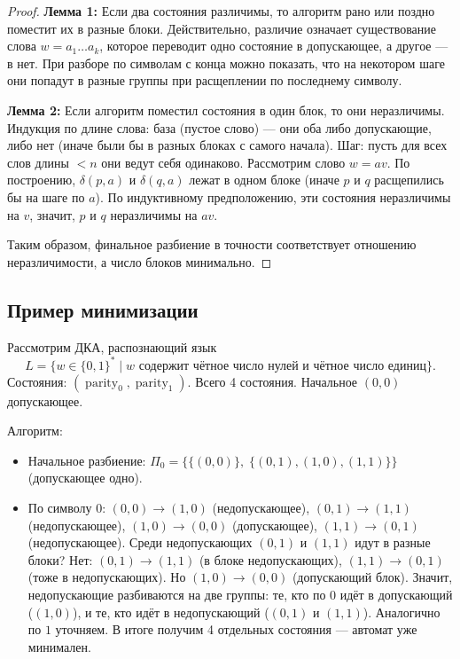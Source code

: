 \documentclass[12pt,a4paper]{article}
\theoremstyle{definition}
\begin{document}
\begin{proof}
\textbf{Лемма 1:} Если два состояния различимы, то алгоритм рано или поздно поместит их в разные блоки.  
Действительно, различие означает существование слова $w = a_1\dots a_k$, которое переводит одно состояние в допускающее, а другое — в нет. При разборе по символам с конца можно показать, что на некотором шаге они попадут в разные группы при расщеплении по последнему символу.

\textbf{Лемма 2:} Если алгоритм поместил состояния в один блок, то они неразличимы.  
Индукция по длине слова: база (пустое слово) — они оба либо допускающие, либо нет (иначе были бы в разных блоках с самого начала). Шаг: пусть для всех слов длины $<n$ они ведут себя одинаково. Рассмотрим слово $w=av$. По построению, $\delta(p,a)$ и $\delta(q,a)$ лежат в одном блоке (иначе $p$ и $q$ расщепились бы на шаге по $a$). По индуктивному предположению, эти состояния неразличимы на $v$, значит, $p$ и $q$ неразличимы на $av$.

Таким образом, финальное разбиение в точности соответствует отношению неразличимости, а число блоков минимально.
\end{proof}

\subsection{Пример минимизации}

Рассмотрим ДКА, распознающий язык $$L = \{w \in \{0,1\}^* \mid w \text{ содержит чётное число нулей и чётное число единиц}\}.$$ Состояния: $(\operatorname{parity}_0, \operatorname{parity}_1)$. Всего 4 состояния. Начальное $(0,0)$ допускающее.

Алгоритм:
\begin{itemize}
\item Начальное разбиение: $\Pi_0 = \{\{(0,0)\},\; \{(0,1),(1,0),(1,1)\}\}$ (допускающее одно).
\item По символу $0$: $(0,0)\to(1,0)$ (недопускающее), $(0,1)\to(1,1)$ (недопускающее), $(1,0)\to(0,0)$ (допускающее), $(1,1)\to(0,1)$ (недопускающее). Среди недопускающих $(0,1)$ и $(1,1)$ идут в разные блоки? Нет: $(0,1)\to(1,1)$ (в блоке недопускающих), $(1,1)\to(0,1)$ (тоже в недопускающих). Но $(1,0)\to(0,0)$ (допускающий блок). Значит, недопускающие разбиваются на две группы: те, кто по $0$ идёт в допускающий ($(1,0)$), и те, кто идёт в недопускающий ($(0,1)$ и $(1,1)$). Аналогично по $1$ уточняем. В итоге получим 4 отдельных состояния — автомат уже минимален.
\end{itemize}
\end{document}
